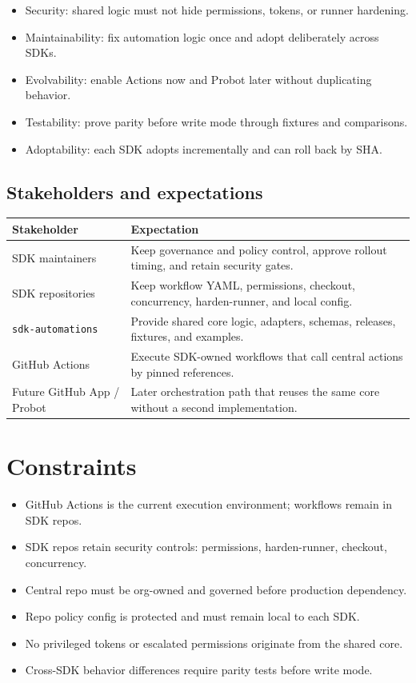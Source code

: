 \documentclass[10pt, a4paper]{article}
\begin{document}
\begin{itemize}[itemsep=0.6pt, topsep=2pt]
  \item Security: shared logic must not hide permissions, tokens, or runner hardening.
  \item Maintainability: fix automation logic once and adopt deliberately across SDKs.
  \item Evolvability: enable Actions now and Probot later without duplicating behavior.
  \item Testability: prove parity before write mode through fixtures and comparisons.
  \item Adoptability: each SDK adopts incrementally and can roll back by SHA.
\end{itemize}

\subsection{Stakeholders and expectations}

\begin{tabularx}{\linewidth}{@{} L{4cm} X @{}}
  \toprule
  \textbf{Stakeholder} & \textbf{Expectation} \\
  \midrule
  SDK maintainers
    & Keep governance and policy control, approve rollout timing, and retain security gates. \\[4pt]
  SDK repositories
    & Keep workflow YAML, permissions, checkout, concurrency, harden-runner, and local config. \\[4pt]
  \texttt{sdk-automations}
    & Provide shared core logic, adapters, schemas, releases, fixtures, and examples. \\[4pt]
  GitHub Actions
    & Execute SDK-owned workflows that call central actions by pinned references. \\[4pt]
  Future GitHub App / Probot
    & Later orchestration path that reuses the same core without a second implementation. \\
  \bottomrule
\end{tabularx}

\section{Constraints}

\begin{itemize}
  \item GitHub Actions is the current execution environment; workflows remain in SDK repos.
  \item SDK repos retain security controls: permissions, harden-runner, checkout, concurrency.
  \item Central repo must be org-owned and governed before production dependency.
  \item Repo policy config is protected and must remain local to each SDK.
  \item No privileged tokens or escalated permissions originate from the shared core.
  \item Cross-SDK behavior differences require parity tests before write mode.
\end{itemize}
\end{document}
